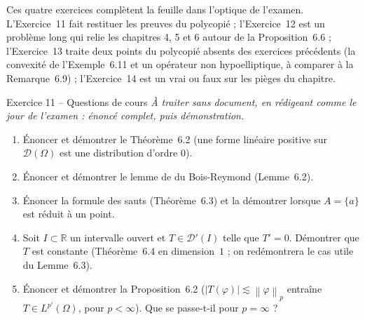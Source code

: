 \documentclass[11pt,a4paper]{article}
\newcommand{\R}{\mathbb{R}}
\newcommand{\norm}[1]{\left\|#1\right\|}
\newcommand{\D}{\mathcal{D}}
\theoremstyle{definition}
\begin{document}
\begin{commentaire}
Ces quatre exercices complètent la feuille dans l'optique de l'examen. L'Exercice~11 fait restituer les preuves du polycopié ; l'Exercice~12 est un problème long qui relie les chapitres 4, 5 et 6 autour de la Proposition~6.6 ; l'Exercice~13 traite deux points du polycopié absents des exercices précédents (la convexité de l'Exemple~6.11 et un opérateur non hypoelliptique, à comparer à la Remarque~6.9) ; l'Exercice~14 est un vrai ou faux sur les pièges du chapitre.
\end{commentaire}

\begin{exo}{Exercice 11 -- Questions de cours}
\emph{À traiter sans document, en rédigeant comme le jour de l'examen : énoncé complet, puis démonstration.}
\begin{enumerate}[label=(\alph*)]
  \item Énoncer et démontrer le Théorème~6.2 (une forme linéaire positive sur $\D(\Omega)$ est une distribution d'ordre $0$).
  \item Énoncer et démontrer le lemme de du Bois-Reymond (Lemme~6.2).
  \item Énoncer la formule des sauts (Théorème~6.3) et la démontrer lorsque $A=\{a\}$ est réduit à un point.
  \item Soit $I\subset\R$ un intervalle ouvert et $T\in\D'(I)$ telle que $T'=0$. Démontrer que $T$ est constante (Théorème~6.4 en dimension~$1$ ; on redémontrera le cas utile du Lemme~6.3).
  \item Énoncer et démontrer la Proposition~6.2 ($|T(\varphi)|\lesssim\norm\varphi_p$ entraîne $T\in L^{p'}(\Omega)$, pour $p<\infty$). Que se passe-t-il pour $p=\infty$ ?
\end{enumerate}
\end{exo}
\end{document}
